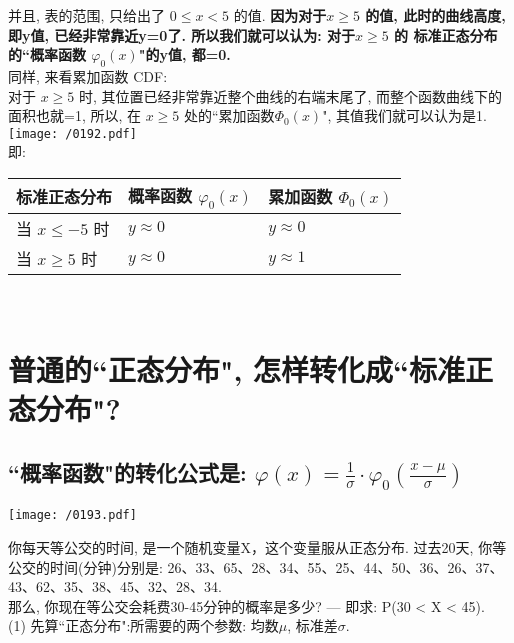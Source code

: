 \documentclass[UTF8]{ctexart}
\begin{document}
并且, 表的范围, 只给出了 $ 0 \leq x < 5$  的值. \textbf{因为对于$ x \geq 5$ 的值, 此时的曲线高度, 即y值, 已经非常靠近y=0了. 所以我们就可以认为: 对于$ x \geq 5$ 的 标准正态分布的``概率函数 $ \varphi_0(x)$"的y值, 都=0.} \\


同样, 来看累加函数 CDF: \\
对于 $ x \geq 5$ 时, 其位置已经非常靠近整个曲线的右端末尾了, 而整个函数曲线下的面积也就=1, 所以, 在 $ x \geq 5$  处的``累加函数$ \Phi_0(x)$", 其值我们就可以认为是1. \\

\texttt{[image: /0192.pdf]}  \\

即: \\
\begin{tabular}{|l|l|l|}
	\hline
	标准正态分布 & 概率函数 $\varphi _0(x)$  & 累加函数 $\Phi _0(x)$ \\
	\hline
	当 $x \leq -5$ 时 & $y \approx 0$ & $y \approx 0$\\
	\hline
	当 $x \geq 5$ 时 & $y \approx 0$ & $y \approx 1$\\
	\hline
\end{tabular} \\








\section{普通的``正态分布", 怎样转化成``标准正态分布"?}

\subsection{``概率函数"的转化公式是: $\boxed{
	\varphi (x)=\frac{1}{\sigma}\cdot \varphi _0(\frac{x-\mu}{\sigma})
	}$}

\texttt{[image: /0193.pdf]} \\




\begin{myEnvSample}
	你每天等公交的时间, 是一个随机变量X，这个变量服从正态分布. 过去20天, 你等公交的时间(分钟)分别是: 26、33、65、28、34、55、25、44、50、36、26、37、43、62、35、38、45、32、28、34. \\
	那么, 你现在等公交会耗费30-45分钟的概率是多少? --- 即求:  P(30 < X < 45). \\
	
	(1) 先算``正态分布":所需要的两个参数: 均数$\mu$, 标准差$\sigma$. \\
	
	
	
\end{myEnvSample}
\end{document}
